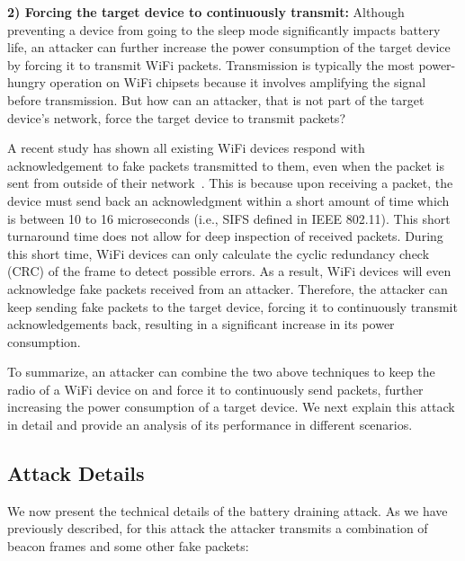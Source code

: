 \textbf{2) Forcing the target device to continuously transmit:} Although preventing a device from going to the sleep mode significantly impacts battery life, an attacker can further increase the power consumption of the target device by forcing it to transmit WiFi packets.
Transmission is typically the most power-hungry operation on WiFi chipsets because it involves amplifying the signal before transmission.
But how can an attacker, that is not part of the target device's network, force the target device to transmit packets?


A recent study has shown all existing WiFi devices respond with acknowledgement to fake packets transmitted to them, even when the packet is sent from outside of their network~\cite{polite-wifi}. This is because upon receiving a packet, the device must send back an acknowledgment within a short amount of time which is between 10 to 16 microseconds (i.e., SIFS defined in IEEE 802.11). This short turnaround time does not allow for deep inspection of received packets. During this short time, WiFi devices can only calculate the cyclic redundancy check (CRC) of the frame to detect possible errors. As a result, WiFi devices will even acknowledge fake packets received from an attacker. Therefore, the attacker can keep sending fake packets to the target device, forcing it to continuously transmit acknowledgements back, resulting in a significant increase in its power consumption. 

To summarize, an attacker can combine the two above techniques to keep the radio of a WiFi device on and force it to continuously send packets, further increasing the power consumption of a target device. We next explain this attack in detail and provide an analysis of its performance in different scenarios.


\subsection{Attack Details}
We now present the technical details of the battery draining attack.
As we have previously described, for this attack the attacker transmits a combination of beacon frames and some other fake packets:

